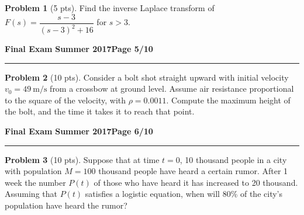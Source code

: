 \documentclass[12pt]{article}
\theoremstyle{definition}
\newtheorem{problem}{Problem}
\begin{document}
\begin{problem}[5 pts]
Find the inverse Laplace transform of $F(s) =\dfrac{s-3}{(s-3)^2+16}$ for $s>3$.
\vspace{4cm}
\begin{flushright}
\end{flushright} 

\end{problem}
\newpage

\hfill{\large\bf Final Exam}\hfill{\large\bf
Summer 2017}\hfill{\large\bf Page 5/10}\hrule

\bigskip
\begin{problem}[10 pts]
Consider a bolt shot straight upward with initial velocity $v_0=49~\mathrm{m}/\mathrm{s}$ from a crossbow at ground level.  Assume air resistance proportional to the square of the velocity, with $\rho = 0.0011$.  Compute the maximum height of the bolt, and the time it takes it to reach that point.
\vspace{19cm}
\begin{flushright}
\end{flushright}
\end{problem}
\newpage

\hfill{\large\bf Final Exam}\hfill{\large\bf
Summer 2017}\hfill{\large\bf Page 6/10}\hrule

\bigskip
\begin{problem}[10 pts]
Suppose that at time $t = 0$, 10 thousand people in a city with population $M = 100$ thousand people have heard a certain rumor. After 1 week the number $P(t)$ of those who have heard it has increased to 20 thousand. Assuming that $P(t)$ satisfies a logistic equation, when will 80\% of the city's population have heard the rumor?
\vspace{19.5cm}
\begin{flushright}
\end{flushright}
\end{problem}
\newpage
\end{document}
